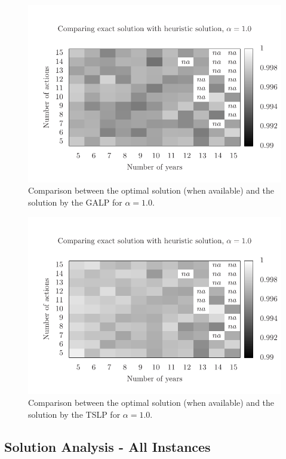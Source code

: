 \begin{figure}
\centering
\includegraphics[scale=0.73, trim=0.75cm 0cm 0 2cm, clip=true]{imgs/comp_easy.pdf}
\caption{Comparison between the optimal solution (when available) 
and the solution by the GALP for $\alpha=1.0$.}
\label{fig:mh1_3}
\end{figure}

\begin{figure}
\centering
\includegraphics[scale=0.73, trim=0.75cm 0cm 0 2cm, clip=true]{imgs/comp_easy_ts.pdf}
\caption{Comparison between the optimal solution (when available) 
and the solution by the TSLP for $\alpha=1.0$.}
\label{fig:mh2_3}
\end{figure}


\subsection{Solution Analysis - All Instances}


